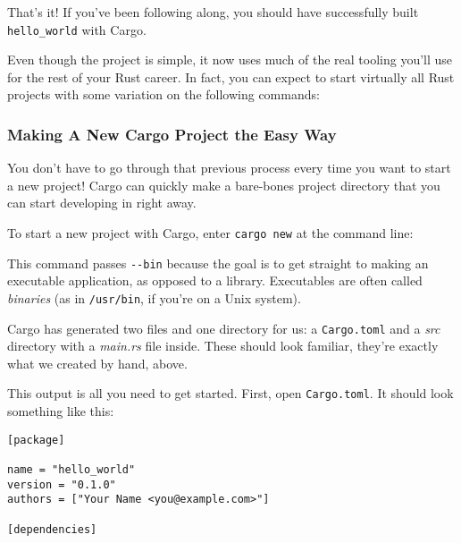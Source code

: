 \documentclass[a4paper,]{book}
\newenvironment{Shaded}{\begin{snugshade}}{\end{snugshade}}
\newcommand{\KeywordTok}[1]{\textcolor[rgb]{0.13,0.29,0.53}{\textbf{{#1}}}}
\newcommand{\NormalTok}[1]{{#1}}
\begin{document}
That's it! If you've been following along, you should have successfully
built \texttt{hello\_world} with Cargo.

Even though the project is simple, it now uses much of the real tooling
you'll use for the rest of your Rust career. In fact, you can expect to
start virtually all Rust projects with some variation on the following
commands:

\begin{Shaded}
\end{Shaded}

\subsubsection{Making A New Cargo Project the Easy
Way}\label{making-a-new-cargo-project-the-easy-way}

You don't have to go through that previous process every time you want
to start a new project! Cargo can quickly make a bare-bones project
directory that you can start developing in right away.

To start a new project with Cargo, enter \texttt{cargo\ new} at the
command line:

\begin{Shaded}
\end{Shaded}

This command passes \texttt{-\/-bin} because the goal is to get straight
to making an executable application, as opposed to a library.
Executables are often called \emph{binaries} (as in \texttt{/usr/bin},
if you're on a Unix system).

Cargo has generated two files and one directory for us: a
\texttt{Cargo.toml} and a \emph{src} directory with a \emph{main.rs}
file inside. These should look familiar, they're exactly what we created
by hand, above.

This output is all you need to get started. First, open
\texttt{Cargo.toml}. It should look something like this:

\begin{verbatim}
[package]

name = "hello_world"
version = "0.1.0"
authors = ["Your Name <you@example.com>"]

[dependencies]
\end{verbatim}
\end{document}
